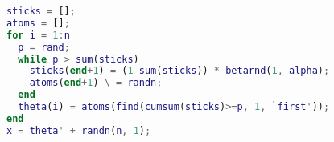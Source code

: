 \begin{lstlisting}[language=Matlab]
sticks = [];
atoms = [];
for i = 1:n
  p = rand;
  while p > sum(sticks)
    sticks(end+1) = (1-sum(sticks)) * betarnd(1, alpha);
    atoms(end+1) \ = randn;
  end
  theta(i) = atoms(find(cumsum(sticks)>=p, 1, `first'));
end
x = theta' + randn(n, 1);
\end{lstlisting}
